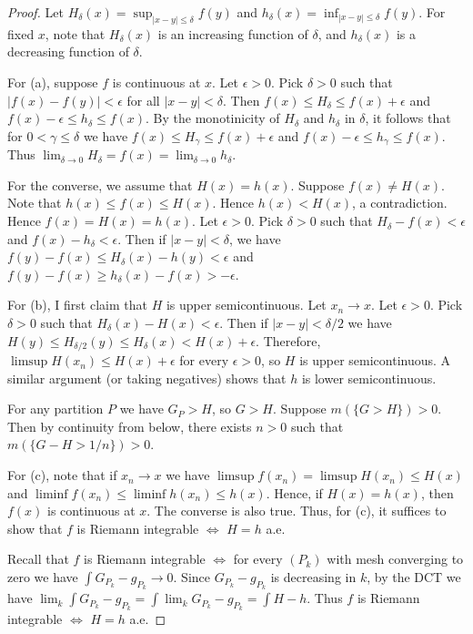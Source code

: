 \documentclass{article}
\begin{document}
\begin{proof}
Let $H_\delta(x) = \sup_{|x - y| \le \delta} f(y)$ and $h_\delta(x) = \inf_{|x - y| \le \delta} f(y)$. For fixed $x$, note that $H_\delta(x)$ is an increasing function of $\delta$, and $h_\delta(x)$ is a decreasing function of $\delta$.

For (a), suppose $f$ is continuous at $x$. Let $\epsilon > 0$. Pick $\delta > 0$ such that $|f(x) - f(y)| < \epsilon$ for all $|x - y| < \delta$.  Then $f(x) \le H_\delta \le f(x) + \epsilon$ and $f(x) - \epsilon \le h_\delta \le f(x)$.  By the monotinicity of $H_\delta$ and $h_\delta$ in $\delta$, it follows that for $0 < \gamma \le  \delta$ we have $f(x) \le H_\gamma \le f(x) + \epsilon$ and $f(x) - \epsilon \le h_\gamma \le f(x)$.  Thus $\lim_{\delta \to 0} H_\delta = f(x) = \lim_{\delta \to 0} h_\delta$.

For the converse, we assume that $H(x) = h(x)$.  Suppose $f(x) \neq H(x)$.  Note that $h(x) \le f(x) \le H(x)$.  Hence $h(x) < H(x)$, a contradiction.  Hence $f(x) = H(x) = h(x)$.  Let $\epsilon > 0$.  Pick $\delta > 0$ such that $H_\delta - f(x) < \epsilon$ and $f(x) - h_\delta < \epsilon$. Then if $|x - y| < \delta$, we have $f(y) - f(x) \le H_\delta(x) - h(y) < \epsilon$ and $f(y) - f(x) \ge h_\delta(x) - f(x) > - \epsilon$.

For (b), I first claim that $H$ is upper semicontinuous. Let $x_n \to x$.  Let $\epsilon > 0$. Pick $\delta > 0$ such that $H_\delta(x)  - H(x) < \epsilon$. Then if $|x - y| < \delta/2$ we have $H(y) \le H_{\delta/2}(y) \le H_\delta(x) < H(x) + \epsilon$.  Therefore, $\limsup H(x_n) \le H(x) + \epsilon$ for every $\epsilon > 0$, so $H$ is upper semicontinuous. A similar argument (or taking negatives) shows that $h$ is lower semicontinuous.

For any partition $P$ we have $G_P > H$, so $G > H$.  Suppose $m(\{G > H \}) > 0$. Then by continuity from below, there exists $n > 0$ such that $m(\{G - H > 1/n\}) > 0$.

For (c), note that if $x_n \to x$ we have $\limsup f(x_n) = \limsup H(x_n) \le H(x)$ and $\liminf f(x_n) \le \liminf h(x_n) \le h(x)$. Hence, if $H(x) = h(x)$, then $f(x)$ is continuous at $x$.  The converse is also true. Thus, for (c), it suffices to show that $f$ is Riemann integrable $\iff$ $H = h$ a.e.

Recall that $f$ is Riemann integrable $\iff$ for every $(P_k)$ with mesh converging to zero we have $\int G_{P_k} - g_{P_k} \to 0$.  Since $G_{P_k} - g_{P_k}$ is decreasing in $k$, by the DCT we have $\lim_k \int G_{P_k} - g_{P_k} = \int \lim_k G_{P_k} - g_{P_k} = \int H - h$.  Thus $f$ is Riemann integrable $\iff$ $H = h$ a.e.
\end{proof}
\end{document}
